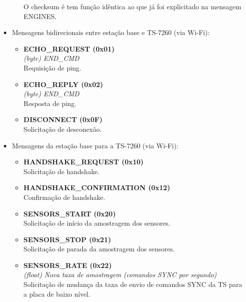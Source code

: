 \begin{itemize}
\begin{itemize}
	  O checksum é tem função idêntica ao que já foi explicitado na mensagem ENGINES.
	  
	  
	\end{itemize}

  \item Mensagens bidirecionais entre estação base e TS-7260 (via Wi-Fi):

    \begin{itemize}
      \item \textbf{ECHO\_REQUEST (0x01)}\\
      \textit{(byte) END\_CMD}\\
	Requisição de ping.
      \item \textbf{ECHO\_REPLY (0x02)}\\
      \textit{(byte) END\_CMD}\\
	Resposta de ping.
      \item \textbf{DISCONNECT (0x0F)} \\
	Solicitação de desconexão.
    \end{itemize}

  \item Mensagens da estação base para a TS-7260 (via Wi-Fi):

    \begin{itemize}
      \item \textbf{HANDSHAKE\_REQUEST (0x10)}\\
	Solicitação de handshake.

      \item \textbf{HANDSHAKE\_CONFIRMATION (0x12)}\\
	Confirmação de handshake.

      \item \textbf{SENSORS\_START (0x20)}\\
	Solicitação de início da amostragem dos sensores.

      \item \textbf{SENSORS\_STOP (0x21)}\\
	Solicitação de parada da amostragem dos sensores.

      \item \textbf{SENSORS\_RATE (0x22)} \\
	\textit{(float) Nova taxa de amostragem (comandos SYNC por segundo)}\\
	Solicitação de mudança da taxa de envio de comandos SYNC da TS para a placa de baixo nível.



\end{itemize}
\end{itemize}
